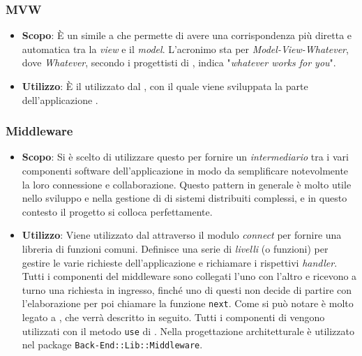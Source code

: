 \subsubsection{MVW}

\begin{itemize}

	\item \textbf{Scopo}: È un  simile a  che permette di avere una corrispondenza più diretta e automatica tra la \textit{view} e il \textit{model}. L'acronimo  sta per \textit{Model-View-Whatever}, dove \textit{Whatever}, secondo i progettisti di , indica "\textit{whatever works for you}".
	\item \textbf{Utilizzo}: È il  utilizzato dal  , con il quale viene sviluppata la parte  dell'applicazione .

\end{itemize}

\subsubsection{Middleware} 

\begin{itemize}

	\item \textbf{Scopo}: Si è scelto di utilizzare questo  per fornire un \textit{intermediario} tra i vari componenti software dell'applicazione in modo da semplificare notevolmente la loro connessione e collaborazione. Questo pattern in generale è molto utile nello sviluppo e nella gestione di di sistemi distribuiti complessi, e in questo contesto il progetto  si colloca perfettamente.
	\item \textbf{Utilizzo}: Viene utilizzato dal   attraverso il modulo \textit{connect} per fornire una libreria di funzioni comuni. Definisce una serie di \textit{livelli} (o funzioni) per gestire le varie richieste dell'applicazione e richiamare i rispettivi \textit{handler}. Tutti i componenti del middleware sono collegati l'uno con l'altro e ricevono a turno una richiesta in ingresso, finché uno di questi non decide di partire con l'elaborazione per poi chiamare la funzione \texttt{next}. Come si può notare è molto legato a , che verrà descritto in seguito. Tutti i componenti di  vengono utilizzati con il metodo \texttt{use} di . Nella progettazione architetturale è utilizzato nel package \texttt{Back-End::Lib::Middleware}.

\end{itemize}

